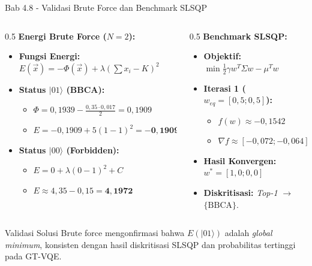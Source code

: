 \begin{frame}{Bab 4.8 - Validasi Brute Force dan Benchmark SLSQP}
    \begin{columns}[T]
        \begin{column}{0.5\textwidth}
            \textbf{Energi Brute Force ($N=2$):}
            \begin{itemize}
                \item \textbf{Fungsi Energi:} $E(\vec{x}) = -\Phi(\vec{x}) + \lambda (\sum x_i - K)^2$
                \item \textbf{Status $|01\rangle$ (BBCA):}
                \begin{itemize}
                    \item $\Phi = 0,1939 - \frac{0,35 \cdot 0,017}{2} = 0,1909$
                    \item $E = -0,1909 + 5(1-1)^2 = \mathbf{-0,1909}$
                \end{itemize}
                \item \textbf{Status $|00\rangle$ (Forbidden):}
                \begin{itemize}
                    \item $E = 0 + \lambda(0-1)^2 + C$
                    \item $E \approx 4,35 - 0,15 = \mathbf{4,1972}$
                \end{itemize}
            \end{itemize}
        \end{column}
        \begin{column}{0.5\textwidth}
            \textbf{Benchmark SLSQP:}
            \begin{itemize}
                \item \textbf{Objektif:} $\min \frac{1}{2}\gamma w^T \Sigma w - \mu^T w$
                \item \textbf{Iterasi 1 ($w_{eq} = [0,5; 0,5]$):}
                \begin{itemize}
                    \item $f(w) \approx -0,1542$
                    \item $\nabla f \approx [-0,072; -0,064]$
                \end{itemize}
                \item \textbf{Hasil Konvergen:} $w^* = [1,0; 0,0]$
                \item \textbf{Diskritisasi:} \textit{Top-1} $\to$ $\{ \text{BBCA} \}$.
            \end{itemize}
        \end{column}
    \end{columns}
    \vspace{0.2cm}
    \begin{exampleblock}{Validasi Solusi}
        Brute force mengonfirmasi bahwa $E(|01\rangle)$ adalah \textit{global minimum}, konsisten dengan hasil diskritisasi SLSQP dan probabilitas tertinggi pada GT-VQE.
    \end{exampleblock}
\end{frame}

